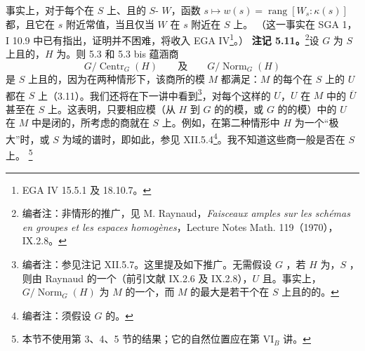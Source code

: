 事实上，对于每个在 $S$ 上、且的 $S$- $W$，函数 $s\mapsto w(s)=\operatorname{rang}[W_s:\kappa(s)]$ 都，且它在 $s$ 附近常值，当且仅当 $W$ 在 $s$ 附近在 $S$ 上。
（这一事实在 SGA 1，I 10.9 中已有指出，证明并不困难，将收入 EGA IV\begingroup\renewcommand{\thefootnote}{\ensuremath{*}}\footnote{EGA IV 15.5.1 及 18.10.7。}\endgroup{}。）
\textbf{注记 5.11。}\footnote[5]{编者注：非情形的推广，见 M. Raynaud，\emph{Faisceaux amples sur les schémas en groupes et les espaces homogènes}，Lecture Notes Math. 119（1970），IX.2.8。}设 $G$ 为 $S$ 上且的，$H$ 为。则 5.3 和 5.3 bis 蕴涵商
\[G/\operatorname{Centr}_G(H)\qquad\text{及}\qquad G/\operatorname{Norm}_G(H)\]
是 $S$ 上且的，因为在两种情形下，该商所的模 $M$ 都满足：$M$ 的每个在 $S$ 上的 $U$ 都在 $S$ 上（3.11）。我们还将在下一讲中看到\footnote[6]{编者注：参见注记 XII.5.7。这里提及如下推广。无需假设 $G$ ，若 $H$ 为，$S$ ，则由 Raynaud 的一个（前引文献 IX.2.6 及 IX.2.8），$U$ 且。事实上，$G/\operatorname{Norm}_G(H)$ 为 $M$ 的一个，而 $M$ 的最大是若干个在 $S$ 上且的的。}，对每个这样的 $U$，$U$ 在 $M$ 中的 $\overline U$ 甚至在 $S$ 上。这表明，只要相应模（从 $H$ 到 $G$ 的的模，或 $G$ 的的模）中的 $U$ 在 $M$ 中是闭的，所考虑的商就在 $S$ 上。例如，在第二种情形中 $H$ 为一个“极大”时，或 $S$ 为域的谱时，即如此，参见 XII.5.4\footnote[7]{编者注：须假设 $G$ 的。}。我不知道这些商一般是否在 $S$ 上。
\begingroup\renewcommand{\thefootnote}{\ensuremath{*}}\footnote{本节不使用第 3、4、5 节的结果；它的自然位置应在第 VI$_B$ 讲。}\endgroup{}
